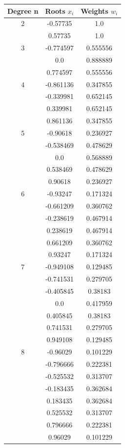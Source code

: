 \documentclass[twoside]{article}
\begin{document}
\newpage

\begin{table}[H]
\centering
\scalebox{0.95} {
\begin{tabular}{|c|c|c|}
\hline
Degree n & Roots \(x_i\) & Weights \(w_i\) \\
\hline
2 & -0.57735 & 1.0 \\
 & 0.57735 & 1.0 \\
\hline
3 & -0.774597 & 0.555556 \\
 & 0.0 & 0.888889 \\
 & 0.774597 & 0.555556 \\
\hline
4 & -0.861136 & 0.347855 \\
 & -0.339981 & 0.652145 \\
 & 0.339981 & 0.652145 \\
 & 0.861136 & 0.347855 \\
\hline
5 & -0.90618 & 0.236927 \\
 & -0.538469 & 0.478629 \\
 & 0.0 & 0.568889 \\
 & 0.538469 & 0.478629 \\
 & 0.90618 & 0.236927 \\
\hline
6 & -0.93247 & 0.171324 \\
 & -0.661209 & 0.360762 \\
 & -0.238619 & 0.467914 \\
 & 0.238619 & 0.467914 \\
 & 0.661209 & 0.360762 \\
 & 0.93247 & 0.171324 \\
\hline
7 & -0.949108 & 0.129485 \\
 & -0.741531 & 0.279705 \\
 & -0.405845 & 0.38183 \\
 & 0.0 & 0.417959 \\
 & 0.405845 & 0.38183 \\
 & 0.741531 & 0.279705 \\
 & 0.949108 & 0.129485 \\
\hline
8 & -0.96029 & 0.101229 \\
 & -0.796666 & 0.222381 \\
 & -0.525532 & 0.313707 \\
 & -0.183435 & 0.362684 \\
 & 0.183435 & 0.362684 \\
 & 0.525532 & 0.313707 \\
 & 0.796666 & 0.222381 \\
 & 0.96029 & 0.101229 \\

\end{tabular}}
\end{table}
\end{document}
